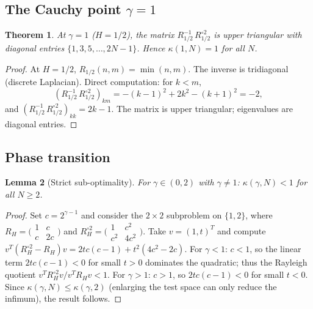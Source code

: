 \documentclass[11pt,a4paper]{article}
\theoremstyle{plain}
\newtheorem{theorem}{Theorem}[section]
\newtheorem{lemma}[theorem]{Lemma}
\theoremstyle{definition}
\theoremstyle{remark}
\begin{document}
\subsection{The Cauchy point $\gamma = 1$}\label{sec:cauchy}

\begin{theorem}\label{thm:cauchy}
At $\gamma = 1$ ($H = 1/2$), the matrix $R_{1/2}^{-1}\,R_{1/2}^{\circ 2}$
is upper triangular with diagonal entries $\{1, 3, 5, \ldots, 2N-1\}$.
Hence $\kappa(1,N) = 1$ for all $N$.
\end{theorem}

\begin{proof}
At $H=1/2$, $R_{1/2}(n,m) = \min(n,m)$. The inverse is tridiagonal
(discrete Laplacian). Direct computation: for $k < m$,
\[
  (R_{1/2}^{-1}\,R_{1/2}^{\circ 2})_{km}
  = -(k-1)^2 + 2k^2 - (k+1)^2 = -2,
\]
and $(R_{1/2}^{-1}\,R_{1/2}^{\circ 2})_{kk} = 2k-1$.
The matrix is upper triangular; eigenvalues are diagonal entries.
\end{proof}


\subsection{Phase transition}

\begin{lemma}[Strict sub-optimality]\label{lem:strict-subopt}
For $\gamma \in (0,2)$ with $\gamma \neq 1$:
$\kappa(\gamma,N) < 1$ for all $N \geq 2$.
\end{lemma}

\begin{proof}
Set $c = 2^{\gamma - 1}$ and consider the $2 \times 2$ subproblem
on $\{1,2\}$, where $R_H = \bigl(\begin{smallmatrix}
1 & c \\ c & 2c \end{smallmatrix}\bigr)$ and
$R_H^{\circ 2} = \bigl(\begin{smallmatrix}
1 & c^2 \\ c^2 & 4c^2 \end{smallmatrix}\bigr)$.
Take $v = (1,t)^T$ and compute
$v^T(R_H^{\circ 2} - R_H)v = 2tc(c-1) + t^2(4c^2 - 2c)$.
For $\gamma < 1$: $c < 1$, so the linear term $2tc(c-1) < 0$ for
small $t > 0$ dominates the quadratic; thus the Rayleigh quotient
$v^T R_H^{\circ 2} v / v^T R_H v < 1$.
For $\gamma > 1$: $c > 1$, so $2tc(c-1) < 0$ for small $t < 0$.
Since $\kappa(\gamma,N) \leq \kappa(\gamma,2)$
(enlarging the test space can only reduce the infimum), the result follows.
\end{proof}
\end{document}
